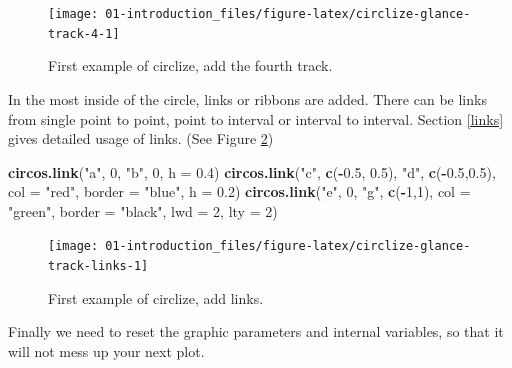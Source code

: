 \documentclass[]{book}
\newenvironment{Shaded}{\begin{snugshade}}{\end{snugshade}}
\newcommand{\KeywordTok}[1]{\textcolor[rgb]{0.13,0.29,0.53}{\textbf{#1}}}
\newcommand{\DataTypeTok}[1]{\textcolor[rgb]{0.13,0.29,0.53}{#1}}
\newcommand{\DecValTok}[1]{\textcolor[rgb]{0.00,0.00,0.81}{#1}}
\newcommand{\FloatTok}[1]{\textcolor[rgb]{0.00,0.00,0.81}{#1}}
\newcommand{\StringTok}[1]{\textcolor[rgb]{0.31,0.60,0.02}{#1}}
\newcommand{\OperatorTok}[1]{\textcolor[rgb]{0.81,0.36,0.00}{\textbf{#1}}}
\newcommand{\NormalTok}[1]{#1}
\theoremstyle{definition}
\theoremstyle{definition}
\theoremstyle{remark}
\begin{document}
\begin{figure}

{\centering \texttt{[image: 01-introduction\_files/figure-latex/circlize-glance-track-4-1]} 

}

\caption{First example of circlize, add the fourth track.}\label{fig:circlize-glance-track-4}
\end{figure}

In the most inside of the circle, links or ribbons are added. There can
be links from single point to point, point to interval or interval to
interval. Section \ref{links} gives detailed usage of links. (See Figure
\ref{fig:circlize-glance-track-links})

\begin{Shaded}
\begin{Highlighting}[]
\KeywordTok{circos.link}\NormalTok{(}\StringTok{"a"}\NormalTok{, }\DecValTok{0}\NormalTok{, }\StringTok{"b"}\NormalTok{, }\DecValTok{0}\NormalTok{, }\DataTypeTok{h =} \FloatTok{0.4}\NormalTok{)}
\KeywordTok{circos.link}\NormalTok{(}\StringTok{"c"}\NormalTok{, }\KeywordTok{c}\NormalTok{(}\OperatorTok{-}\FloatTok{0.5}\NormalTok{, }\FloatTok{0.5}\NormalTok{), }\StringTok{"d"}\NormalTok{, }\KeywordTok{c}\NormalTok{(}\OperatorTok{-}\FloatTok{0.5}\NormalTok{,}\FloatTok{0.5}\NormalTok{), }\DataTypeTok{col =} \StringTok{"red"}\NormalTok{,}
    \DataTypeTok{border =} \StringTok{"blue"}\NormalTok{, }\DataTypeTok{h =} \FloatTok{0.2}\NormalTok{)}
\KeywordTok{circos.link}\NormalTok{(}\StringTok{"e"}\NormalTok{, }\DecValTok{0}\NormalTok{, }\StringTok{"g"}\NormalTok{, }\KeywordTok{c}\NormalTok{(}\OperatorTok{-}\DecValTok{1}\NormalTok{,}\DecValTok{1}\NormalTok{), }\DataTypeTok{col =} \StringTok{"green"}\NormalTok{, }\DataTypeTok{border =} \StringTok{"black"}\NormalTok{, }\DataTypeTok{lwd =} \DecValTok{2}\NormalTok{, }\DataTypeTok{lty =} \DecValTok{2}\NormalTok{)}
\end{Highlighting}
\end{Shaded}

\begin{figure}

{\centering \texttt{[image: 01-introduction\_files/figure-latex/circlize-glance-track-links-1]} 

}

\caption{First example of circlize, add links.}\label{fig:circlize-glance-track-links}
\end{figure}

Finally we need to reset the graphic parameters and internal variables,
so that it will not mess up your next plot.
\end{document}
